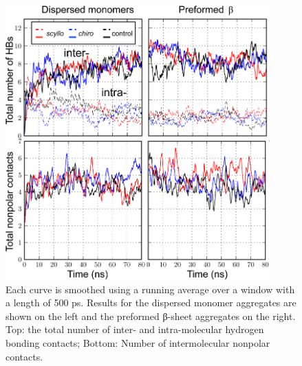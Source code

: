 \begin{figure}[ht]
  \centering
  \includegraphics[width=4in]{figures/results1/GA4_paper_figures_submitted-5}
  \caption[Time evolution of peptide-peptide nonpolar and hydrogen bonding contacts in disordered aggregates in presence and absence of inositol (control).]{Each curve is smoothed using a running average over a window with a length of 500 ps. Results for the dispersed monomer aggregates are shown on the left and the preformed β-sheet aggregates on the right. Top: the total number of inter- and intra-molecular hydrogen bonding contacts; Bottom: Number of intermolecular nonpolar contacts.}
   \label{fig:figure5}
\end{figure}
  
